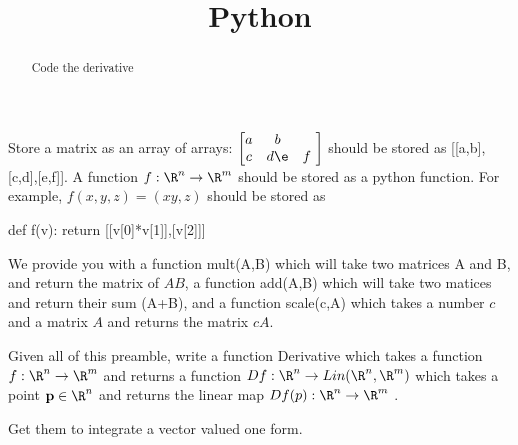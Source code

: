 \documentclass{ximera}
\title{Python}
\begin{document}
\begin{abstract}
	Code the derivative	
\end{abstract}

\begin{exercise}
	Store a matrix as an array of arrays: $\begin{bmatrix} a&b\\c&d \e&f\ \end{bmatrix}$  should be stored as [[a,b],[c,d],[e,f]].
	A function $f:\R^n \to \R^m$ should be stored as a python function.  For example, $f(x,y,z) = (xy,z)$ should be stored as
	
		def f(v):
			return [[v[0]*v[1]],[v[2]]]
	
	We provide you with a function mult(A,B) which will take two matrices A and B, and return the matrix of $AB$, 
	a function add(A,B) which will take two matices and return their sum (A+B),
	and a function scale(c,A) which takes a number $c$ and a matrix $A$ and returns the matrix $cA$.
	
	
	Given all of this preamble, write a function Derivative which takes a function  $f: \R^n \to \R^m$ and returns a 
	function $Df: \R^n \to Lin(\R^n,\R^m)$ which takes a point $\mathbf{p} \in \R^n$ and returns the linear map
	$Df(p):\R^n \to \R^m$ .
	
	\begin{solution}
	
	\end{solution}
\end{exercise}

\begin{exercise}
	Get them to integrate a vector valued one form.
\end{exercise}
\end{document}
